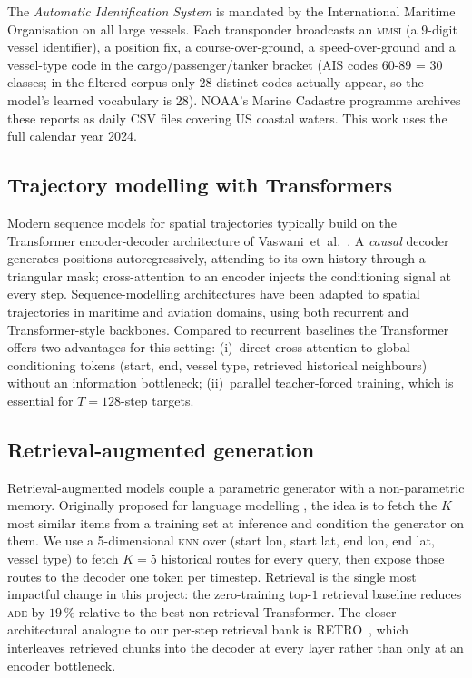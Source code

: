 \documentclass[oneside, a4paper, onecolumn, 11pt]{article}
\newcommand{\ade}{\textsc{ade}}
\newcommand{\knn}{\textsc{knn}}
\begin{document}
The \emph{Automatic Identification System} is mandated by the
International Maritime Organisation on all large vessels.  Each
transponder broadcasts an \textsc{mmsi} (a 9-digit vessel identifier),
a position fix, a course-over-ground, a speed-over-ground and a
vessel-type code in the cargo/passenger/tanker bracket
(AIS codes 60-89 = 30 classes; in the filtered corpus only 28 distinct
codes actually appear, so the model's learned vocabulary is 28).
NOAA's Marine
Cadastre programme archives these reports as daily CSV files covering
US coastal waters.  This work uses the full calendar year 2024.

\subsection{Trajectory modelling with Transformers}

Modern sequence models for spatial trajectories typically build on the
Transformer encoder-decoder architecture of
Vaswani~et~al.~\cite{vaswani2017attention}.
A \emph{causal} decoder generates positions autoregressively, attending
to its own history through a triangular mask; cross-attention to an
encoder injects the conditioning signal at every step.
Sequence-modelling architectures have been adapted to spatial
trajectories in maritime \cite{nguyen2020transformer} and aviation
\cite{capobianco2021lstm} domains, using both recurrent and
Transformer-style backbones.  Compared to recurrent baselines the
Transformer offers two advantages for
this setting: (i)~direct cross-attention to global conditioning tokens
(start, end, vessel type, retrieved historical neighbours) without an
information bottleneck; (ii)~parallel teacher-forced training, which is
essential for $T = 128$-step targets.

\subsection{Retrieval-augmented generation}

Retrieval-augmented models couple a parametric generator with a
non-parametric memory.  Originally proposed for language modelling
\cite{khandelwal2020nearest,lewis2020retrieval}, the idea is to fetch
the $K$ most similar items from a training set at inference and
condition the generator on them.
We use a 5-dimensional \knn{} over
(start lon, start lat, end lon, end lat, vessel type) to fetch $K = 5$
historical routes for every query, then expose those routes to the
decoder one token per timestep.
Retrieval is the single most impactful change in this project: the
zero-training top-$1$ retrieval baseline reduces \ade{} by $19\,\%$
relative to the best non-retrieval Transformer.  The closer
architectural analogue to our per-step retrieval bank is
RETRO~\cite{borgeaud2022retro}, which interleaves retrieved chunks
into the decoder at every layer rather than only at an encoder
bottleneck.
\end{document}
